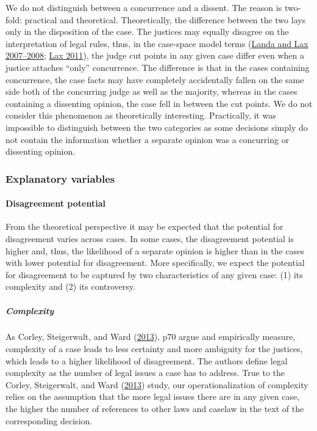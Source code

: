 \documentclass[
  11pt,
]{article}
\begin{document}
We do not distinguish between a concurrence and a dissent. The reason is
two-fold: practical and theoretical. Theoretically, the difference
between the two lays only in the disposition of the case. The justices
may equally disagree on the interpretation of legal rules, thus, in the
case-space model terms
(\protect\hyperlink{ref-landaDisagreementsCollegialCourts2007}{Landa and
Lax 2007--2008}; \protect\hyperlink{ref-laxNewJudicialPolitics2011}{Lax
2011}), the judge cut points in any given case differ even when a
justice attaches ``only'' concurrence. The difference is that in the
cases containing concurrence, the case facts may have completely
accidentally fallen on the same side both of the concurring judge as
well as the majority, whereas in the cases containing a dissenting
opinion, the case fell in between the cut points. We do not consider
this phenomenon as theoretically interesting. Practically, it was
impossible to distinguish between the two categories as some decisions
simply do not contain the information whether a separate opinion was a
concurring or dissenting opinion.

\hypertarget{explanatory-variables}{%
\subsubsection{Explanatory variables}\label{explanatory-variables}}

\hypertarget{disagreement-potential}{%
\paragraph{Disagreement potential}\label{disagreement-potential}}

From the theoretical perspective it may be expected that the potential
for disagreement varies across cases. In some cases, the disagreement
potential is higher and, thus, the likelihood of a separate opinion is
higher than in the cases with lower potential for disagreement. More
specifically, we expect the potential for disagreement to be captured by
two characteristics of any given case: (1) its complexity and (2) its
controversy.

\hypertarget{complexity}{%
\subparagraph{Complexity}\label{complexity}}

As Corley, Steigerwalt, and Ward
(\protect\hyperlink{ref-corleyPuzzleUnanimityConsensus2013}{2013}), p70
argue and empirically measure, complexity of a case leads to less
certainty and more ambiguity for the justices, which leads to a higher
likelihood of disagreement. The authors define legal complexity as the
number of legal issues a case has to address. True to the Corley,
Steigerwalt, and Ward
(\protect\hyperlink{ref-corleyPuzzleUnanimityConsensus2013}{2013})
study, our operationalization of complexity relies on the assumption
that the more legal issues there are in any given case, the higher the
number of references to other laws and caselaw in the text of the
corresponding decision.
\end{document}
